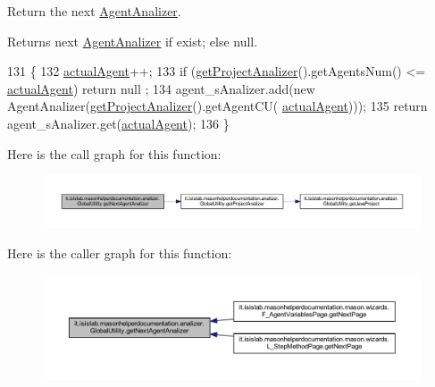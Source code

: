 Return the next \hyperlink{classit_1_1isislab_1_1masonhelperdocumentation_1_1analizer_1_1_agent_analizer}{Agent\-Analizer}. \begin{DoxyReturn}{Returns}
next \hyperlink{classit_1_1isislab_1_1masonhelperdocumentation_1_1analizer_1_1_agent_analizer}{Agent\-Analizer} if exist; else null. 
\end{DoxyReturn}

\begin{DoxyCode}
131                                                       \{
132         \hyperlink{classit_1_1isislab_1_1masonhelperdocumentation_1_1analizer_1_1_global_utility_a8106b6699b9c7834ead4fc38d62a2575}{actualAgent}++;
133         \textcolor{keywordflow}{if} (\hyperlink{classit_1_1isislab_1_1masonhelperdocumentation_1_1analizer_1_1_global_utility_af6bcca0c06ec6fa8c2b2b88f5050914c}{getProjectAnalizer}().getAgentsNum() <= \hyperlink{classit_1_1isislab_1_1masonhelperdocumentation_1_1analizer_1_1_global_utility_a8106b6699b9c7834ead4fc38d62a2575}{actualAgent})    \textcolor{keywordflow}{return} null
      ;
134         agent\_sAnalizer.add(\textcolor{keyword}{new} AgentAnalizer(\hyperlink{classit_1_1isislab_1_1masonhelperdocumentation_1_1analizer_1_1_global_utility_af6bcca0c06ec6fa8c2b2b88f5050914c}{getProjectAnalizer}().getAgentCU(
      \hyperlink{classit_1_1isislab_1_1masonhelperdocumentation_1_1analizer_1_1_global_utility_a8106b6699b9c7834ead4fc38d62a2575}{actualAgent})));
135         \textcolor{keywordflow}{return} agent\_sAnalizer.get(\hyperlink{classit_1_1isislab_1_1masonhelperdocumentation_1_1analizer_1_1_global_utility_a8106b6699b9c7834ead4fc38d62a2575}{actualAgent});     
136     \}
\end{DoxyCode}


Here is the call graph for this function\-:\nopagebreak
\begin{figure}[H]
\begin{center}
\leavevmode
\includegraphics[width=350pt]{classit_1_1isislab_1_1masonhelperdocumentation_1_1analizer_1_1_global_utility_a918557388574cea36be74712ff768d0a_cgraph}
\end{center}
\end{figure}




Here is the caller graph for this function\-:\nopagebreak
\begin{figure}[H]
\begin{center}
\leavevmode
\includegraphics[width=350pt]{classit_1_1isislab_1_1masonhelperdocumentation_1_1analizer_1_1_global_utility_a918557388574cea36be74712ff768d0a_icgraph}
\end{center}
\end{figure}



